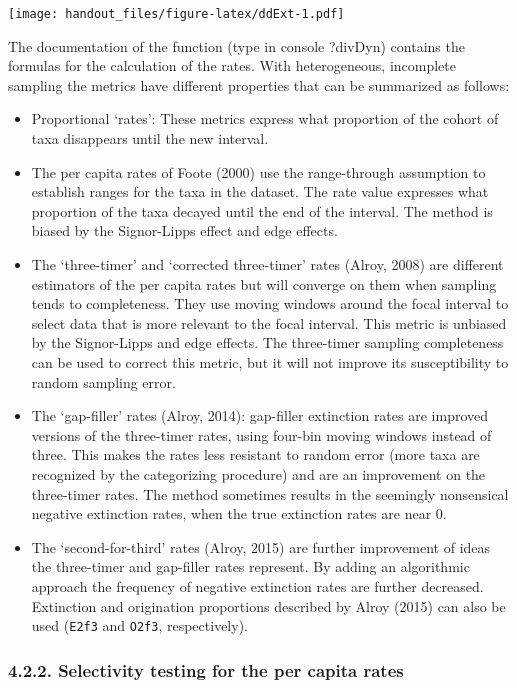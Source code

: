 \documentclass[]{article}
\begin{document}
\texttt{[image: handout\_files/figure-latex/ddExt-1.pdf]}

The documentation of the function (type in console ?divDyn) contains the
formulas for the calculation of the rates. With heterogeneous,
incomplete sampling the metrics have different properties that can be
summarized as follows:

\begin{itemize}
\item
  Proportional `rates': These metrics express what proportion of the
  cohort of taxa disappears until the new interval.
\item
  The per capita rates of Foote (2000) use the range-through assumption
  to establish ranges for the taxa in the dataset. The rate value
  expresses what proportion of the taxa decayed until the end of the
  interval. The method is biased by the Signor-Lipps effect and edge
  effects.
\item
  The `three-timer' and `corrected three-timer' rates (Alroy, 2008) are
  different estimators of the per capita rates but will converge on them
  when sampling tends to completeness. They use moving windows around
  the focal interval to select data that is more relevant to the focal
  interval. This metric is unbiased by the Signor-Lipps and edge
  effects. The three-timer sampling completeness can be used to correct
  this metric, but it will not improve its susceptibility to random
  sampling error.
\item
  The `gap-filler' rates (Alroy, 2014): gap-filler extinction rates are
  improved versions of the three-timer rates, using four-bin moving
  windows instead of three. This makes the rates less resistant to
  random error (more taxa are recognized by the categorizing procedure)
  and are an improvement on the three-timer rates. The method sometimes
  results in the seemingly nonsensical negative extinction rates, when
  the true extinction rates are near 0.
\item
  The `second-for-third' rates (Alroy, 2015) are further improvement of
  ideas the three-timer and gap-filler rates represent. By adding an
  algorithmic approach the frequency of negative extinction rates are
  further decreased. Extinction and origination proportions described by
  Alroy (2015) can also be used (\texttt{E2f3} and \texttt{O2f3},
  respectively).
\end{itemize}

\subsubsection{4.2.2. Selectivity testing for the per capita
rates}\label{selectivity-testing-for-the-per-capita-rates}
\end{document}
